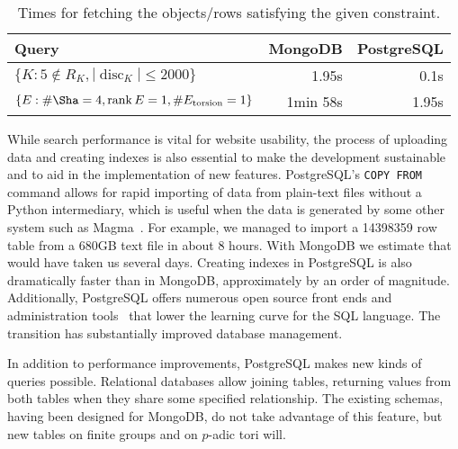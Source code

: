 \documentclass{amsart}
\DeclareMathOperator{\rank}{rank}
\begin{document}
\begin{table}[h!]
  \begin{center}
  \begin{tabular}{l|r|r}
Query & MongoDB & PostgreSQL\\
\hline
$\{K : 5 \notin R_K, |\operatorname{disc}_K| \leq 2000\}$ & 1.95s & 0.1s\\
$\{E : \# \Sha = 4, \rank E = 1, \# E_{\text{torsion}} = 1\}$ & 1min 58s & 1.95s\\
\end{tabular}
\caption{Times for fetching the objects/rows satisfying the given constraint.}
\label{table:indexless}
\end{center}
\end{table}



While search performance is vital for website usability, the process of uploading data and creating indexes is also essential to make the development sustainable and to aid in the implementation of new features.
PostgreSQL's \texttt{COPY FROM} command allows for rapid importing of data from plain-text files without a Python intermediary, which is useful when the data is generated by some other system such as Magma~\cite{magma}.
For example, we managed to import a 14398359 row table from a 680GB text file in about 8 hours.
With MongoDB we estimate that would have taken us several days.
Creating indexes in PostgreSQL is also dramatically faster than in MongoDB, approximately by an order of magnitude.
Additionally, PostgreSQL offers numerous open source front ends and administration tools~\cite{pgadmin,adminer} that lower the learning curve for the SQL language.
The transition has substantially improved database management.

In addition to performance improvements, PostgreSQL makes new kinds of queries possible.
Relational databases allow joining tables, returning values from both tables when they share some specified relationship.
The existing schemas, having been designed for MongoDB, do not take advantage of this feature, but new tables on finite groups and on $p$-adic tori will.
\end{document}
